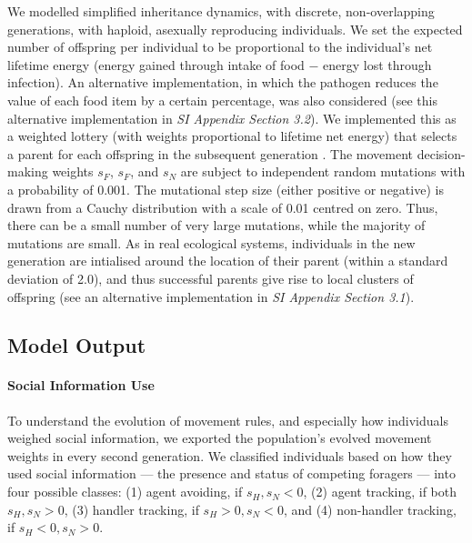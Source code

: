 We modelled simplified inheritance dynamics, with discrete, non-overlapping generations, with haploid, asexually reproducing individuals.
We set the expected number of offspring per individual to be proportional to the individual's net lifetime energy (energy gained through intake of food $-$ energy lost through infection).
An alternative implementation, in which the pathogen reduces the value of each food item by a certain percentage, was also considered (see this alternative implementation in \textit{SI Appendix Section 3.2}).
We implemented this as a weighted lottery (with weights proportional to lifetime net energy) that selects a parent for each offspring in the subsequent generation \citep[see prior implementation in][]{netz2021a, gupte2021a}.
The movement decision-making weights $s_F$, $s_F$, and $s_N$ are subject to independent random mutations with a probability of 0.001.
The mutational step size (either positive or negative) is drawn from a Cauchy distribution with a scale of 0.01 centred on zero.
Thus, there can be a small number of very large mutations, while the majority of mutations are small.
As in real ecological systems, individuals in the new generation are intialised around the location of their parent (within a standard deviation of 2.0), and thus successful parents give rise to local clusters of offspring (see an alternative implementation in \textit{SI Appendix Section 3.1}).

\subsection*{Model Output}

\paragraph{Social Information Use}

To understand the evolution of movement rules, and especially how individuals weighed social information, we exported the population's evolved movement weights in every second generation.
We classified individuals based on how they used social information --- the presence and status of competing foragers --- into four possible classes: (1) agent avoiding, if $s_H, s_N < 0$, (2) agent tracking, if both $s_H, s_N > 0$, (3) handler tracking, if $s_H > 0, s_N < 0$, and (4) non-handler tracking, if $s_H < 0, s_N > 0$.

